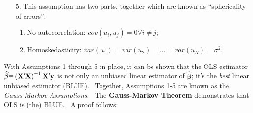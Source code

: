 \documentclass[11pt]{article}
\begin{document}
\begin{enumerate}
\item[5.] This assumption has two parts, together which are known as
\textquotedblleft sphericality of errors\textquotedblright : 

\begin{enumerate}
\item No autocorrelation: $cov\left( u_{i},u_{j}\right) =0\forall i\neq j;$%
{\small \ }

\item Homoskedasticity: $var\left( u_{1}\right) =var\left( u_{2}\right)
=...=var\left( u_{N}\right) =\sigma ^{2}.$\bigskip 
\end{enumerate}
\end{enumerate}

With Assumptions 1 through 5 in place, it can be shown that {\small the OLS
estimator }$\widehat{\mathbf{\beta }}{\small \equiv }\left( \mathbf{X}%
^{\prime }\mathbf{X}\right) ^{-1}\mathbf{X}^{\prime }\mathbf{y}$ is not only
an unbiased linear estimator of $\widehat{\mathbf{\beta }}$; it's the 
\textit{best }linear unbiased estimator (BLUE). \ Together, Assumptions 1-5
are known as the \textit{Gauss-Markov Assumptions}. \ The \textbf{%
Gauss-Markov Theorem} demonstrates that {\small OLS is (the) BLUE. \ A proof
follows:}\bigskip 
\end{document}
